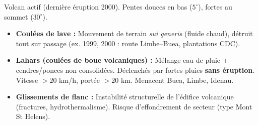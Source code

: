 \documentclass[11pt]{article}
\begin{document}
\begin{exemplebox}
Volcan actif (dernière éruption 2000). Pentes douces en bas ($5^\circ$), fortes au sommet ($30^\circ$).
\begin{itemize}
    \item \textbf{Coulées de lave :} Mouvement de terrain \textit{sui generis} (fluide chaud), détruit tout sur passage (ex. 1999, 2000 : route Limbe–Buea, plantations CDC).
    \item \textbf{Lahars (coulées de boue volcaniques) :} Mélange eau de pluie + cendres/ponces non consolidées. Déclenchés par fortes pluies \textbf{sans éruption}. Vitesse $> 20$ km/h, portée $> 20$ km. Menacent Buea, Limbe, Idenau.
    \item \textbf{Glissements de flanc :} Instabilité structurelle de l'édifice volcanique (fractures, hydrothermalisme). Risque d'effondrement de secteur (type Mont St Helens).
\end{itemize}
\end{exemplebox}
\end{document}
